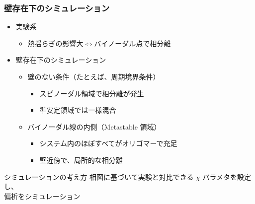 \documentclass[unicode,12pt]{beamer}%
\begin{document}
%
\begin{frame}
	\frametitle{壁存在下のシミュレーション}
	\begin{itemize}
		\item 実験系
		\begin{itemize}
		\item 熱揺らぎの影響大$\Leftrightarrow$バイノーダル点で相分離
		\end{itemize}
		\item 壁存在下のシミュレーション
		\begin{itemize}
			\item 壁のない条件（たとえば、周期境界条件）
			\begin{itemize}
				\item スピノーダル領域で相分離が発生
				\item 準安定領域では一様混合
			\end{itemize}
			\item バイノーダル線の内側（Metastable 領域）
			\begin{itemize}
				\item システム内のほぼすべてがオリゴマーで充足
				\item 壁近傍で、局所的な相分離
			\end{itemize}
		\end{itemize}
	\end{itemize}

	\begin{alertblock}{シミュレーションの考え方}
	相図に基づいて実験と対比できる $\chi$ パラメタを設定し、\\
	偏析をシミュレーション
	\end{alertblock}
\end{frame}
\end{document}
